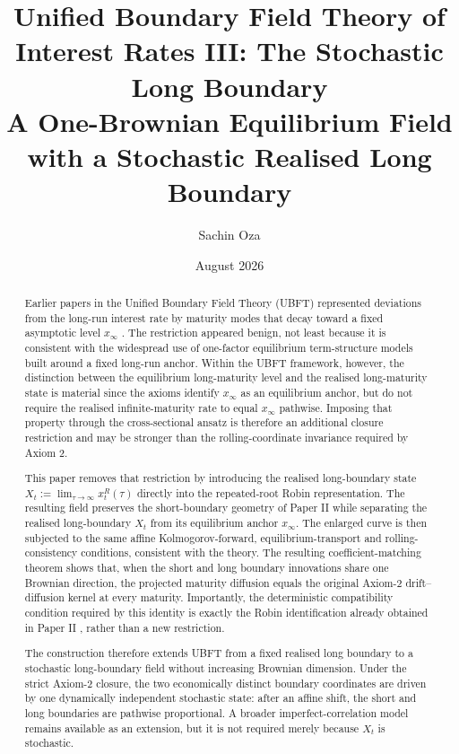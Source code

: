 \documentclass[11pt]{article}
\title{\textbf{Unified Boundary Field Theory of Interest Rates III: The Stochastic Long Boundary}\\[0.5em]
\large A One-Brownian Equilibrium Field with a Stochastic Realised Long Boundary}
\author{Sachin Oza}
\date{August 2026}
\numberwithin{equation}{section}
\begin{document}
\maketitle

\begin{abstract}
Earlier papers in the Unified Boundary Field Theory (UBFT) represented deviations from the long-run interest rate by maturity modes that decay toward a fixed asymptotic level $x_\infty$ \cite{OzaIRFR,OzaShortBoundary}. The restriction appeared benign, not least because it is consistent with the widespread use of one-factor equilibrium term-structure models built around a fixed long-run anchor. Within the UBFT framework, however, the distinction between the equilibrium long-maturity level and the realised long-maturity state is material since the axioms identify $x_\infty$ as an equilibrium anchor, but do not require the realised infinite-maturity rate to equal $x_\infty$ pathwise. Imposing that property through the cross-sectional ansatz is therefore an additional closure restriction and may be stronger than the rolling-coordinate invariance required by Axiom 2.

This paper removes that restriction by introducing the realised long-boundary state $X_t:=\lim_{\tau\to\infty}x_t^R(\tau)$ directly into the repeated-root Robin representation. The resulting field preserves the short-boundary geometry of Paper II \cite{OzaShortBoundary} while separating the realised long-boundary $X_t$ from its equilibrium anchor $x_\infty$. The enlarged curve is then subjected to the same affine Kolmogorov-forward, equilibrium-transport and rolling-consistency conditions, consistent with the theory. The resulting coefficient-matching theorem shows that, when the short and long boundary innovations share one Brownian direction, the projected maturity diffusion equals the original Axiom-2 drift--diffusion kernel at every maturity. Importantly, the deterministic compatibility condition required by this identity is exactly the Robin identification already obtained in Paper II \cite{OzaShortBoundary}, rather than a new restriction.

The construction therefore extends UBFT from a fixed realised long boundary to a stochastic long-boundary field without increasing Brownian dimension. Under the strict Axiom-2 closure, the two economically distinct boundary coordinates are driven by one dynamically independent stochastic state: after an affine shift, the short and long boundaries are pathwise proportional. A broader imperfect-correlation model remains available as an extension, but it is not required merely because $X_t$ is stochastic.
\end{abstract}
\end{document}
